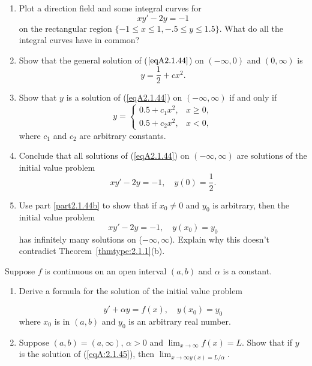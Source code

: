 \documentclass{ximera}
\begin{document}
\begin{problem}\label{exer:2.1.44}
\begin{enumerate}
\item %
Plot a direction field and some integral curves for
\begin{equation}\label{eqA2.1.44}
    xy'-2y=-1
\end{equation}
on the rectangular region  $\{-1\leq x\leq 1, -.5\leq y\leq 1.5\}$.
What do all the integral curves have in common?
\item \label{part2.1.44b}%
Show that the general solution of ($\ref{eqA2.1.44}$)
on $(-\infty,0)$ and $(0,\infty)$ is
$$
y=\frac{1}{2}+cx^2.
$$
\item %
Show that $y$ is a solution of (\ref{eqA2.1.44}) on
$(-\infty,\infty)$ if and only if
$$
y=\left\{\begin{array}{ll}0.5+c_1x^2, &x
\ge 0,\\
0.5+c_2x^2, &x < 0,\end{array}\right.
$$
 where $c_1$ and $c_2$ are arbitrary constants.
\item %
Conclude that all solutions of (\ref{eqA2.1.44}) on
$(-\infty,\infty)$ are solutions of the initial value problem
$$
xy'-2y=-1,\quad y(0)=\frac{1}{2}.
$$
\item %
Use part \ref{part2.1.44b} to show that if  $x_0\neq 0$ and $y_0$  is arbitrary, then
  the  initial value problem
$$
xy'-2y=-1,\quad y(x_0)=y_0
$$
has infinitely many solutions on ($-\infty,\infty$). Explain why this
doesn't contradict  Theorem~\ref{thmtype:2.1.1}(b).
\end{enumerate}
\end{problem}

\begin{problem}\label{exer:2.1.45}
Suppose $f$ is continuous on an open interval $(a,b)$
and $\alpha$ is a constant.
\begin{enumerate}
\item %
Derive a formula for the solution of the initial value
problem

\begin{equation}\label{eqA:2.1.45}
y'+\alpha y=f(x),\quad y(x_0)=y_0
\end{equation}
where $x_0$ is in $(a,b)$ and $y_0$ is an arbitrary real number.

\item %
Suppose $(a,b)=(a,\infty)$, $\alpha > 0$ and
$\lim_{x\to\infty} f(x)=L$. Show that if $y$ is the
solution of (\ref{eqA:2.1.45}), then $\lim_{x\to
\infty y(x)=L/\alpha}$.
\end{enumerate}
\end{problem}
\end{document}
